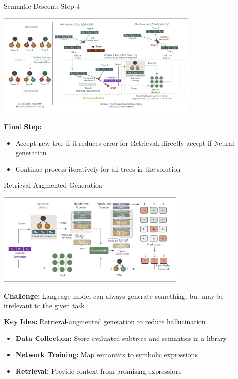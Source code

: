 \documentclass[aspectratio=1610]{beamer}
\begin{document}
    \begin{frame}{Semantic Descent: Step 4}
        \begin{center}
            \includegraphics[width=0.75\textwidth, trim=8pt 8pt 8pt 8pt, clip]{figs/Motivation.pdf}
        \end{center}

        \textbf{Final Step:}
        \begin{itemize}
            \item Accept new tree if it reduces error for Retrieval, directly accept if Neural generation
            \item Continue process iteratively for all trees in the solution
        \end{itemize}
    \end{frame}

    \begin{frame}{Retrieval-Augmented Generation}
        \begin{center}
            \includegraphics[width=0.7\textwidth]{figs/NN.pdf}
        \end{center}

        \textbf{Challenge:} Language model can always generate something, but may be irrelevant to the given task

        \textbf{Key Idea:} Retrieval-augmented generation to reduce hallucination

        \begin{itemize}
            \item \textbf{Data Collection:} Store evaluated subtrees and semantics in a library
            \item \textbf{Network Training:} Map semantics to symbolic expressions
            \item \textbf{Retrieval:} Provide context from promising expressions
        \end{itemize}
    \end{frame}
\end{document}
